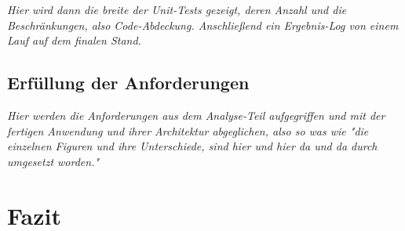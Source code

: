 \emph{Hier wird dann die breite der Unit-Tests gezeigt, deren Anzahl und die Beschränkungen, also Code-Abdeckung. Anschließend ein Ergebnis-Log von einem Lauf auf dem finalen Stand.}

\subsection{Erfüllung der Anforderungen}
\label{subsec:erfullung_anforderungen}

\emph{Hier werden die Anforderungen aus dem Analyse-Teil aufgegriffen und mit der fertigen Anwendung und ihrer Architektur abgeglichen, also so was wie "die einzelnen Figuren und ihre Unterschiede, sind hier und hier da und da durch umgesetzt worden."}

\section{Fazit}
\label{sec:Fazit}